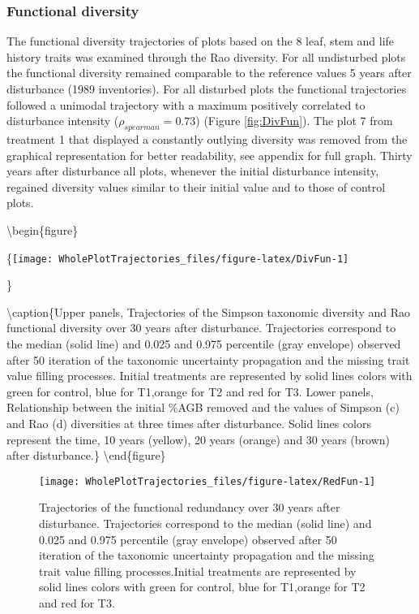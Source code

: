 \documentclass[fleqn,10pt]{ArtEcoFoG} %
\theoremstyle{definition}
\theoremstyle{definition}
\theoremstyle{definition}
\theoremstyle{remark}
\begin{document}
\subsubsection{Functional diversity}\label{functional-diversity}

The functional diversity trajectories of plots based on the 8 leaf, stem
and life history traits was examined through the Rao diversity. For all
undisturbed plots the functional diversity remained comparable to the
reference values 5 years after disturbance (1989 inventories). For all
disturbed plots the functional trajectories followed a unimodal
trajectory with a maximum positively correlated to disturbance intensity
(\(\rho_{spearman}=0.73\)) (Figure \ref{fig:DivFun}). The plot 7 from
treatment 1 that displayed a constantly outlying diversity was removed
from the graphical representation for better readability, see appendix
for full graph. Thirty years after disturbance all plots, whenever the
initial disturbance intensity, regained diversity values similar to
their initial value and to those of control plots.

\textbackslash{}begin\{figure\}

\{\centering \texttt{[image: WholePlotTrajectories\_files/figure-latex/DivFun-1]}

\}

\textbackslash{}caption\{Upper panels, Trajectories of the Simpson
taxonomic diversity and Rao functional diversity over 30 years after
disturbance. Trajectories correspond to the median (solid line) and
0.025 and 0.975 percentile (gray envelope) observed after 50 iteration
of the taxonomic uncertainty propagation and the missing trait value
filling processes. Initial treatments are represented by solid lines
colors with green for control, blue for T1,orange for T2 and red for T3.
Lower panels, Relationship between the initial \%AGB removed and the
values of Simpson (c) and Rao (d) diversities at three times after
disturbance. Solid lines colors represent the time, 10 years (yellow),
20 years (orange) and 30 years (brown) after
disturbance.\}\label{fig:DivFun} \textbackslash{}end\{figure\}

\begin{figure}

{\centering \texttt{[image: WholePlotTrajectories\_files/figure-latex/RedFun-1]} 

}

\caption{Trajectories of the functional redundancy over 30 years after disturbance. Trajectories correspond to the median (solid line) and 0.025 and 0.975 percentile (gray envelope) observed after 50 iteration of the taxonomic uncertainty propagation and the missing trait value filling processes.Initial treatments are represented by solid lines colors with green for control, blue for T1,orange for T2 and red for T3.}\label{fig:RedFun}
\end{figure}
\end{document}

